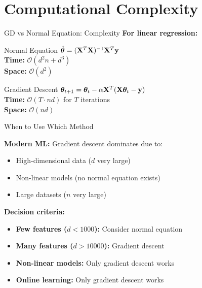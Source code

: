 \documentclass[usenames,dvipsnames]{beamer}
\begin{document}
  \section{Computational Complexity}

  \begin{frame}{GD vs Normal Equation: Complexity}
    \textbf{For linear regression:}
    
    \begin{alertbox}{Normal Equation}
    $\hat{\boldsymbol{\theta}} = (\mathbf{X}^T\mathbf{X})^{-1}\mathbf{X}^T\mathbf{y}$
    \\\textbf{Time:} $\mathcal{O}(d^2n + d^3)$
    \\\textbf{Space:} $\mathcal{O}(d^2)$ 
    \end{alertbox}
    
    \pause
    \begin{keypointsbox}{Gradient Descent}  
    $\boldsymbol{\theta}_{t+1} = \boldsymbol{\theta}_t - \alpha \mathbf{X}^T(\mathbf{X}\boldsymbol{\theta}_t - \mathbf{y})$
    \\\textbf{Time:} $\mathcal{O}(T \cdot nd)$ for $T$ iterations
    \\\textbf{Space:} $\mathcal{O}(nd)$
    \end{keypointsbox}
  \end{frame}

  \begin{frame}{When to Use Which Method}
    \begin{keypointsbox}{}
    \textbf{Modern ML:} Gradient descent dominates due to:
    \begin{itemize}
        \item High-dimensional data ($d$ very large)
        \item Non-linear models (no normal equation exists)
        \item Large datasets ($n$ very large)
    \end{itemize}
    \end{keypointsbox}
    
    \pause
    \textbf{Decision criteria:}
    \begin{itemize}[<+->]
        \item \textbf{Few features ($d < 1000$):} Consider normal equation
        \item \textbf{Many features ($d > 10000$):} Gradient descent
        \item \textbf{Non-linear models:} Only gradient descent works
        \item \textbf{Online learning:} Only gradient descent works
    \end{itemize}
  \end{frame}
\end{document}
